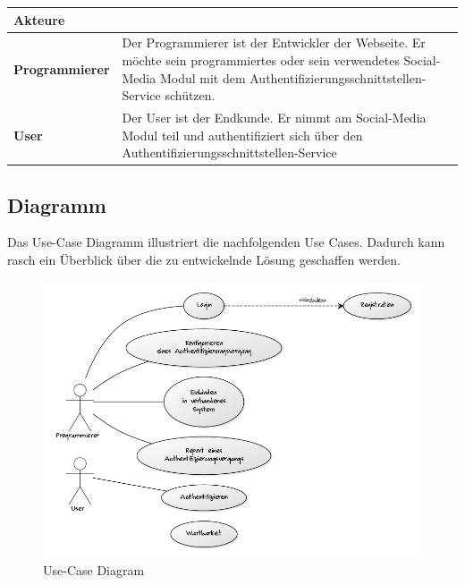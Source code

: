 \begin{longtable}[c]{@{}ll@{}}
\toprule
\begin{minipage}[b]{0.34\columnwidth}\raggedright\strut
\textbf{Akteure}
\strut\end{minipage} &
\begin{minipage}[b]{0.60\columnwidth}\raggedright\strut
\strut\end{minipage}\tabularnewline
\midrule
\endhead
\begin{minipage}[t]{0.34\columnwidth}\raggedright\strut
\textbf{Programmierer}
\strut\end{minipage} &
\begin{minipage}[t]{0.60\columnwidth}\raggedright\strut
Der Programmierer ist der Entwickler der Webseite. Er möchte sein
programmiertes oder sein verwendetes Social-Media Modul mit dem
Authentifizierungsschnittstellen-Service schützen.
\strut\end{minipage}\tabularnewline
\begin{minipage}[t]{0.34\columnwidth}\raggedright\strut
\textbf{User}
\strut\end{minipage} &
\begin{minipage}[t]{0.60\columnwidth}\raggedright\strut
Der User ist der Endkunde. Er nimmt am Social-Media Modul teil und
authentifiziert sich über den Authentifizierungsschnittstellen-Service
\strut\end{minipage}\tabularnewline
\bottomrule
\end{longtable}

\newpage

\subsection{Diagramm}\label{diagramm}

Das Use-Case Diagramm illustriert die nachfolgenden Use Cases. Dadurch
kann rasch ein Überblick über die zu entwickelnde Lösung geschaffen
werden.

\begin{figure}[htbp]
\centering
\includegraphics{images/use-case-diagram.png}
\caption{Use-Case Diagram}
\end{figure}

